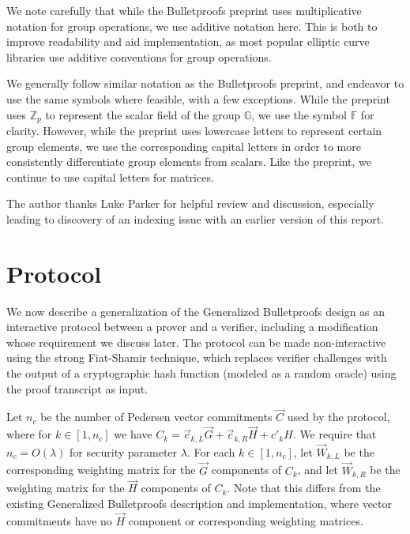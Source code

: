 \documentclass{article}
\newcommand{\GG}{\mathbb{G}}
\newcommand{\FF}{\mathbb{F}}
\newcommand{\mat}[1]{\vec{#1}}
\begin{document}
We note carefully that while the Bulletproofs preprint uses multiplicative notation for group operations, we use additive notation here.
This is both to improve readability and aid implementation, as most popular elliptic curve libraries use additive conventions for group operations.

We generally follow similar notation as the Bulletproofs preprint, and endeavor to use the same symbols where feasible, with a few exceptions.
While the preprint uses $\mathbb{Z}_p$ to represent the scalar field of the group $\GG$, we use the symbol $\FF$ for clarity.
However, while the preprint uses lowercase letters to represent certain group elements, we use the corresponding capital letters in order to more consistently differentiate group elements from scalars.
Like the preprint, we continue to use capital letters for matrices.

The author thanks Luke Parker for helpful review and discussion, especially leading to discovery of an indexing issue with an earlier version of this report.


\section{Protocol}

We now describe a generalization of the Generalized Bulletproofs design as an interactive protocol between a prover and a verifier, including a modification whose requirement we discuss later.
The protocol can be made non-interactive using the strong Fiat-Shamir technique, which replaces verifier challenges with the output of a cryptographic hash function (modeled as a random oracle) using the proof transcript as input.

Let $n_c$ be the number of Pedersen vector commitments $\vec{C}$ used by the protocol, where for $k \in [1, n_c]$ we have $C_k = \vec{c}_{k,L} \vec{G} + \vec{c}_{k,R} \vec{H} + c'_k H$.
We require that $n_c = O(\lambda)$ for security parameter $\lambda$.
For each $k \in [1, n_c]$, let $\mat{W}_{k,L}$ be the corresponding weighting matrix for the $\vec{G}$ components of $C_k$, and let $\mat{W}_{k,R}$ be the weighting matrix for the $\vec{H}$ components of $C_k$.
Note that this differs from the existing Generalized Bulletproofs description and implementation, where vector commitments have no $\vec{H}$ component or corresponding weighting matrices.
\end{document}
